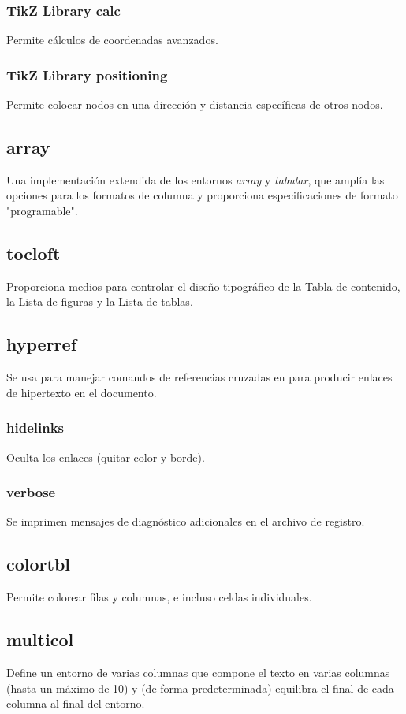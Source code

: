 \documentclass[12pt]{article}
\begin{document}
\subsubsection{TikZ Library calc}
Permite cálculos de coordenadas avanzados.\cite{calc}
\subsubsection{TikZ Library positioning}
Permite colocar nodos en una dirección y distancia específicas de otros nodos.\cite{positioning}
\subsection{array}
Una implementación extendida de los entornos \textit{array} y \textit{tabular}, que amplía las opciones para los formatos de columna y proporciona especificaciones de formato "programable".\cite{array}
\subsection{tocloft}
Proporciona medios para controlar el diseño tipográfico de la Tabla de contenido, la Lista de figuras y la Lista de tablas.\cite{tocloft}
\subsection{hyperref}
Se usa para manejar comandos de referencias cruzadas en  para producir enlaces de hipertexto en el documento.\cite{hyperref}
\subsubsection{hidelinks}
Oculta los enlaces (quitar color y borde).\cite{hidelinks}
\subsubsection{verbose}
Se imprimen mensajes de diagnóstico adicionales en el archivo de registro.\cite{verbose}
\subsection{colortbl}
Permite colorear filas y columnas, e incluso celdas individuales.\cite{colortbl}
\subsection{multicol}
Define un entorno de varias columnas que compone el texto en varias columnas (hasta un máximo de 10) y (de forma predeterminada) equilibra el final de cada columna al final del entorno.\cite{multicol}
\end{document}
